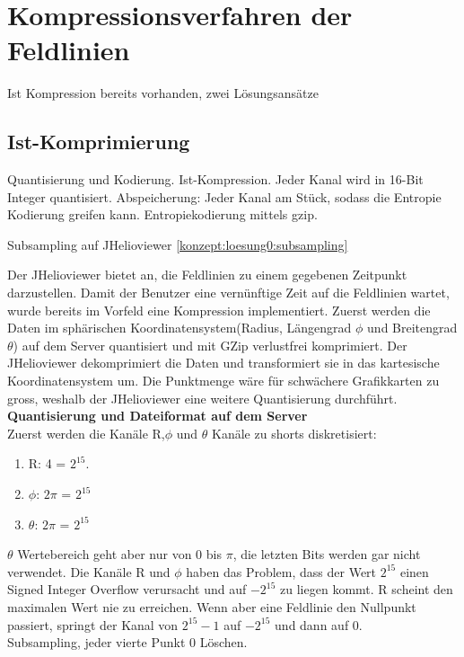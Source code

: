 \section{Kompressionsverfahren der Feldlinien} \label{konzept}
Ist Kompression bereits vorhanden, zwei Lösungsansätze

\subsection{Ist-Komprimierung} \label{konzept:ist-komprimierung}
Quantisierung und Kodierung. 
Ist-Kompression. Jeder Kanal wird in 16-Bit Integer quantisiert.
Abspeicherung: Jeder Kanal am Stück, sodass die Entropie Kodierung greifen kann. Entropiekodierung mittels gzip.

Subsampling auf JHelioviewer \ref{konzept:loesung0:subsampling}

Der JHelioviewer bietet an, die Feldlinien zu einem gegebenen Zeitpunkt darzustellen. Damit der Benutzer eine vernünftige Zeit auf die Feldlinien wartet, wurde bereits im Vorfeld eine Kompression implementiert. Zuerst werden die Daten im sphärischen Koordinatensystem(Radius, Längengrad $\phi$ und Breitengrad $\theta$) auf dem Server quantisiert und mit GZip verlustfrei komprimiert. Der JHelioviewer dekomprimiert die Daten und transformiert sie in das kartesische Koordinatensystem um. Die Punktmenge wäre für schwächere Grafikkarten zu gross, weshalb der JHelioviewer eine weitere Quantisierung durchführt.\\
[\baselineskip]
\textbf{Quantisierung und Dateiformat auf dem Server}\\
Zuerst werden die Kanäle R,$\phi$ und $\theta$ Kanäle zu shorts diskretisiert:
\begin{enumerate}
 \item R: 4 = $2^{15}$. 
 \item $\phi$: $2\pi$ = $2^{15}$
 \item $\theta$: $2\pi$ = $2^{15}$
\end{enumerate}
$\theta$ Wertebereich geht aber nur von 0 bis $\pi$, die letzten Bits werden gar nicht verwendet. Die Kanäle R und $\phi$ haben das Problem, dass der Wert $2^{15}$ einen Signed Integer Overflow verursacht und auf $-2^{15}$ zu liegen kommt. R scheint den maximalen Wert nie zu erreichen. Wenn aber eine Feldlinie den Nullpunkt passiert, springt der Kanal von  $2^{15}-1$ auf $-2^{15}$ und dann auf 0.\\
[\baselineskip]
Subsampling, jeder vierte Punkt 
0 Löschen.


